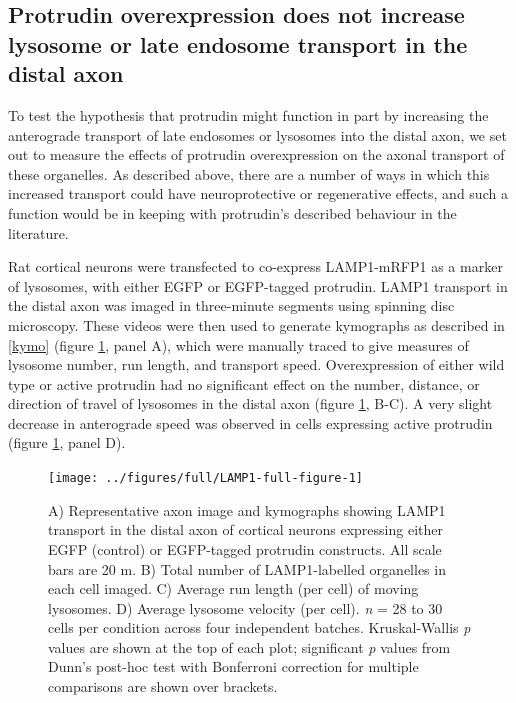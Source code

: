 \documentclass[
  12pt,
  a4paper,
]{book}
\begin{document}
\subsection{Protrudin overexpression does not increase lysosome or late endosome transport in the distal axon}\label{lyso-LE}

To test the hypothesis that protrudin might function in part by increasing the anterograde transport of late endosomes or lysosomes into the distal axon, we set out to measure the effects of protrudin overexpression on the axonal transport of these organelles. As described above, there are a number of ways in which this increased transport could have neuroprotective or regenerative effects, and such a function would be in keeping with protrudin's described behaviour in the literature.

Rat cortical neurons were transfected to co-express LAMP1-mRFP1 as a marker of lysosomes, with either EGFP or EGFP-tagged protrudin. LAMP1 transport in the distal axon was imaged in three-minute segments using spinning disc microscopy. These videos were then used to generate kymographs as described in \ref{kymo} (figure \ref{fig:LAMP1-full-figure}, panel A), which were manually traced to give measures of lysosome number, run length, and transport speed. Overexpression of either wild type or active protrudin had no significant effect on the number, distance, or direction of travel of lysosomes in the distal axon (figure \ref{fig:LAMP1-full-figure}, B-C). A very slight decrease in anterograde speed was observed in cells expressing active protrudin (figure \ref{fig:LAMP1-full-figure}, panel D).



\begin{figure}
\texttt{[image: ../figures/full/LAMP1-full-figure-1]} \caption[Protrudin effect on lysosome (LAMP1) transport in the distal axon]{A) Representative axon image and kymographs showing LAMP1 transport in the distal axon of cortical neurons expressing either EGFP (control) or EGFP-tagged protrudin constructs. All scale bars are 20 \textmu{}m. B) Total number of LAMP1-labelled organelles in each cell imaged. C) Average run length (per cell) of moving lysosomes. D) Average lysosome velocity (per cell). \emph{n} = 28 to 30 cells per condition across four independent batches. Kruskal-Wallis \emph{p} values are shown at the top of each plot; significant \emph{p} values from Dunn's post-hoc test with Bonferroni correction for multiple comparisons are shown over brackets.}\label{fig:LAMP1-full-figure}
\end{figure}
\end{document}
